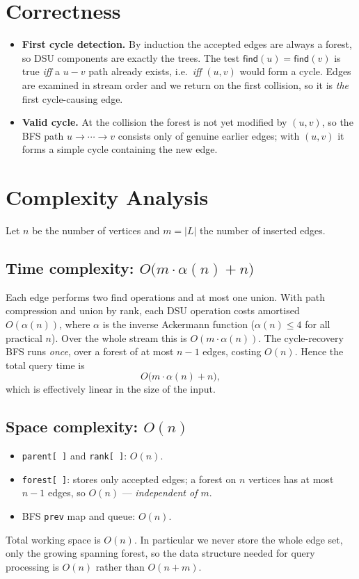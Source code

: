 \documentclass[11pt]{article}
\newcommand{\answer}[1]{%
  \par\smallskip\noindent
  \fcolorbox{accent}{accent!6}{%
    \parbox{\dimexpr\linewidth-2\fboxsep-2\fboxrule\relax}{%
      \textbf{\color{accent}Result.}\ #1}}%
  \par\smallskip}
\begin{document}
\answer{$\big[[5,0],\ [5,4,3,2,1,0,5]\big]$}

\section{Correctness}
\begin{itemize}[leftmargin=1.4em, itemsep=3pt]
  \item \textbf{First cycle detection.} By induction the accepted edges are
  always a forest, so DSU components are exactly the trees. The test
  $\textsf{find}(u)=\textsf{find}(v)$ is true \emph{iff} a $u\!-\!v$ path already
  exists, i.e.\ \emph{iff} $(u,v)$ would form a cycle. Edges are examined in
  stream order and we return on the first collision, so it is \emph{the} first
  cycle-causing edge.
  \item \textbf{Valid cycle.} At the collision the forest is not yet modified by
  $(u,v)$, so the BFS path $u\rightarrow\cdots\rightarrow v$ consists only of
  genuine earlier edges; with $(u,v)$ it forms a simple cycle containing the new
  edge.
\end{itemize}

\section{Complexity Analysis}
Let $n$ be the number of vertices and $m=|L|$ the number of inserted edges.

\subsection{Time complexity: $O\big(m\cdot\alpha(n)+n\big)$}
Each edge performs two \textsf{find} operations and at most one \textsf{union}.
With path compression and union by rank, each DSU operation costs amortised
$O(\alpha(n))$, where $\alpha$ is the inverse Ackermann function
($\alpha(n)\le 4$ for all practical $n$). Over the whole stream this is
$O(m\cdot\alpha(n))$. The cycle-recovery BFS runs \emph{once}, over a forest of
at most $n-1$ edges, costing $O(n)$. Hence the total query time is
\[
  O\big(m\cdot\alpha(n)+n\big),
\]
which is effectively linear in the size of the input.

\subsection{Space complexity: $O(n)$}
\begin{itemize}[leftmargin=1.4em, itemsep=2pt]
  \item \texttt{parent[\,]} and \texttt{rank[\,]}: $O(n)$.
  \item \texttt{forest[\,]}: stores only accepted edges; a forest on $n$
  vertices has at most $n-1$ edges, so $O(n)$ --- \emph{independent of $m$}.
  \item BFS \texttt{prev} map and queue: $O(n)$.
\end{itemize}
Total working space is $O(n)$. In particular we never store the whole edge set,
only the growing spanning forest, so the data structure needed for query
processing is $O(n)$ rather than $O(n+m)$.
\end{document}
